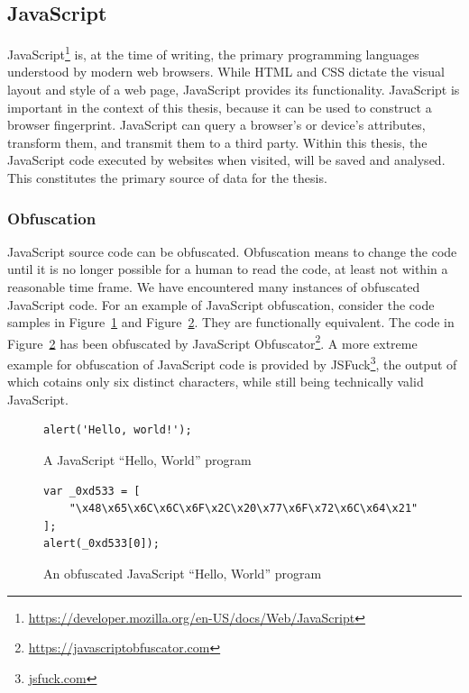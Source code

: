 \documentclass[
    fontsize=12pt,
    headings=small,
    parskip=half,
    bibliography=totoc,
    numbers=noenddot,
    open=any
    ]{scrreprt}
\begin{document}
\subsection{JavaScript}
\label{fundamentals:javascript}
JavaScript\footnote{\url{https://developer.mozilla.org/en-US/docs/Web/JavaScript}} is,
at the time of writing, the primary programming languages understood
by modern web browsers. While HTML and CSS dictate the visual layout and style
of a web page, JavaScript provides its functionality.
JavaScript is important in the context of this thesis, because
it can be used to construct a browser fingerprint. JavaScript can query
a browser's or device's attributes, transform them, and transmit them
to a third party.
Within this thesis, the JavaScript code executed by websites
when visited, will be saved and analysed.
This constitutes the primary source of data for the thesis.

\subsubsection{Obfuscation}
\label{fundamentals:obfuscation}
JavaScript source code can be obfuscated. Obfuscation means to change the code
until it is no longer possible for a human to read the code, at least not within
a reasonable time frame. We have encountered many instances of obfuscated JavaScript
code. For an example of JavaScript obfuscation, consider the code samples in
Figure~\ref{code:javascript_hello_world} and Figure~\ref{code:javascript_obfuscated}.
They are functionally equivalent. The code in Figure~\ref{code:javascript_obfuscated}
has been obfuscated by JavaScript Obfuscator\footnote{\url{https://javascriptobfuscator.com}}.
A more extreme example for obfuscation of JavaScript code is provided by JSFuck\footnote{\url{jsfuck.com}},
the output of which cotains only six distinct characters, while still being technically valid JavaScript.

\begin{figure}
\centering
\begin{verbatim}
alert('Hello, world!');
\end{verbatim}
\caption{A JavaScript ``Hello, World'' program}
\label{code:javascript_hello_world}
\end{figure}

\begin{figure}
\centering
\begin{verbatim}
var _0xd533 = [
    "\x48\x65\x6C\x6C\x6F\x2C\x20\x77\x6F\x72\x6C\x64\x21"
];
alert(_0xd533[0]);
\end{verbatim}
\caption{An obfuscated JavaScript ``Hello, World'' program}
\label{code:javascript_obfuscated}
\end{figure}
\end{document}
